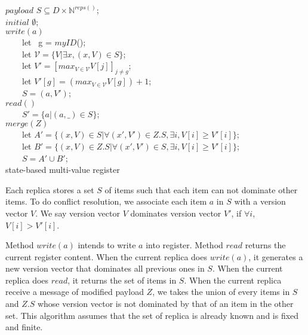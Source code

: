 \renewcommand{\algorithmcfname}{CRDT Implementation}
\noindent
\noindent\begin{algorithm}[H]
$\mathit{payload}$ $S \subseteq D \times \mathbb{N}^{\mathit{reps}()}$; \\
$\mathit{initial}$ $\emptyset$; \\

$\mathit{write}(a)$ \\
\ \ \ \ let \ g = $\mathit{myID}$(); \\
\ \ \ \ let $\mathcal{V} = \{ V \vert \exists x, (x,V) \in S \}$; \\
\ \ \ \ let $V' = [ \mathit{max}_{V \in \mathcal{V}} V[j] ]_{j \neq g}$; \\
\ \ \ \ let $V'[g] = (\mathit{max}_{V \in \mathcal{V}} V[g]) + 1$; \\
\ \ \ \ $S = (a,V')$; \\

$\mathit{read}()$ \\
\ \ \ \ \KwRet $S' = \{ a \vert (a,\_) \in S \}$; \\

$\mathit{merge}(Z)$ \\
\ \ \ \ let $A' = \{ (x,V) \in S \vert \forall (x',V') \in Z.S, \exists i, V[i] \geq V'[i] \}$; \\
\ \ \ \ let $B' = \{ (x,V) \in Z.S \vert \forall (x',V') \in S, \exists i, V[i] \geq V'[i] \}$; \\
\ \ \ \ $S = A' \cup B'$; \\
\caption{state-based multi-value register}
\label{Method1}
\end{algorithm}

Each replica stores a set $S$ of items such that each item can not dominate other items. To do conflict resolution, we associate each item $a$ in $S$ with a version vector $V$. We say version vector $V$ dominates version vector $V'$, if $\forall i$, $V[i] > V'[i]$.

Method $\mathit{write}(a)$ intends to write $a$ into register. Method $\mathit{read}$ returns the current register content. When the current replica does $\mathit{write}(a)$, it generates a new version vector that dominates all previous ones in $S$. When the current replica does $\mathit{read}$, it returns the set of items in $S$. When the current replica receive a message of modified payload $Z$, we takes the union of every items in $S$ and $Z.S$ whose version vector is not dominated by that of an item in the other set. This algorithm assumes that the set of replica is already known and is fixed and finite.


